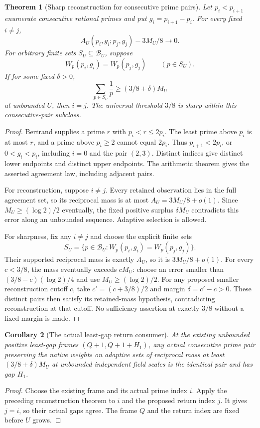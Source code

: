\documentclass[11pt]{article}
\newtheorem{theorem}{Theorem}[section]
\newtheorem{corollary}[theorem]{Corollary}
\begin{document}
\begin{theorem}[Sharp reconstruction for consecutive prime pairs]
\label{thm:native-consecutive-three-eighths}
Let \(p_i<p_{i+1}\) enumerate consecutive rational primes and put
\(g_i=p_{i+1}-p_i\). For every fixed \(i\ne j\),
\[
                  A_U(p_i,g_i;p_j,g_j)-3M_U/8\longrightarrow0.
\]
For arbitrary finite sets \(S_U\subseteq\mathcal B_U\), suppose
\[
 W_p(p_i,g_i)=W_p(p_j,g_j)\qquad(p\in S_U).
\]
If for some fixed \(\delta>0\),
\[
                  \sum_{p\in S_U}\frac1p
                         \ge(3/8+\delta)M_U
\]
at unbounded \(U\), then \(i=j\).
The universal threshold \(3/8\) is sharp within this
consecutive-pair subclass.
\end{theorem}
\begin{proof}
Bertrand supplies a prime \(r\) with \(p_i<r\le2p_i\).
The least prime above \(p_i\) is at most \(r\), and a prime above
\(p_i\ge2\) cannot equal \(2p_i\). Thus
\(p_{i+1}<2p_i\), or \(0<g_i<p_i\), including \(i=0\) and the
pair \((2,3)\). Distinct indices give distinct lower endpoints
and distinct upper endpoints. The arithmetic theorem gives the
asserted agreement law, including adjacent pairs.

For reconstruction, suppose \(i\ne j\). Every retained observation
lies in the full agreement set, so its reciprocal mass is at most
\(A_U=3M_U/8+o(1)\). Since \(M_U\ge(\log2)/2\) eventually,
the fixed positive surplus \(\delta M_U\) contradicts this error
along an unbounded sequence. Adaptive selection is allowed.

For sharpness, fix any \(i\ne j\) and choose the explicit finite sets
\[
 S_U=\{p\in\mathcal B_U:
                    W_p(p_i,g_i)=W_p(p_j,g_j)\}.
\]
Their supported reciprocal mass is exactly \(A_U\), so it is
\(3M_U/8+o(1)\). For every \(c<3/8\), the mass eventually exceeds
\(cM_U\): choose an error smaller than
\((3/8-c)(\log2)/4\) and use \(M_U\ge(\log2)/2\).
For any proposed smaller reconstruction cutoff \(c\), take
\(c'=(c+3/8)/2\) and margin \(\delta=c'-c>0\).
These distinct pairs then satisfy its retained-mass hypothesis,
contradicting reconstruction at that cutoff.
No sufficiency assertion at exactly \(3/8\) without a fixed margin
is made.
\end{proof}

\begin{corollary}[The actual least-gap return consumer]
\label{cor:native-consecutive-least-gap}
At the existing unbounded positive least-gap frames
\((Q+1,Q+1+H_1)\), any actual consecutive prime pair preserving
the native weights on adaptive sets of reciprocal mass at least
\((3/8+\delta)M_U\) at unbounded independent field scales is the
identical pair and has gap \(H_1\).
\end{corollary}
\begin{proof}
Choose the existing frame and its actual prime index \(i\).
Apply the preceding reconstruction theorem to \(i\) and the proposed
return index \(j\). It gives \(j=i\), so their actual gaps agree.
The frame \(Q\) and the return index are fixed before \(U\) grows.
\end{proof}
\end{document}
